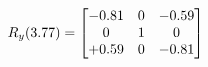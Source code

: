 \documentclass[preview]{standalone}
\begin{document}
\begin{align*}
\special{dvisvgm:raw <g id='unique000'>}R_{y}(3.77) = \begin{bmatrix}-0.81 & 0 & -0.59 \\0 & 1 & 0 \\+0.59 & 0 & -0.81\end{bmatrix}\special{dvisvgm:raw </g>}
\end{align*}
\end{document}
